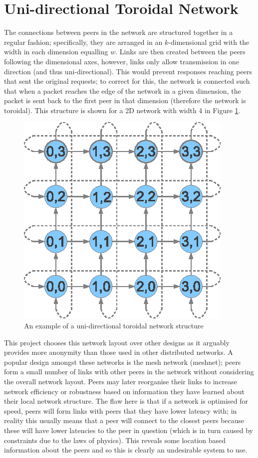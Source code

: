 \documentclass[ %
                    author={Luke Murray},
                supervisor={Dr. Simon Hollis},
                     title={Shadow Peer-to-Peer Networks},
                  subtitle={},
                    degree={MEng},
                      year={2013} ]{thesis}
\begin{document}
\section{Uni-directional Toroidal Network}
\label{sec:network_structure}

The connections between peers in the network are structured together in a regular fashion; specifically, they are arranged in an $k$-dimensional grid with the width in each dimension equalling $w$. Links are then created between the peers following the dimensional axes, however, links only allow transmission in one direction (and thus uni-directional). This would prevent responses reaching peers that sent the original requests; to correct for this, the network is connected such that when a packet reaches the edge of the network in a given dimension, the packet is sent back to the first peer in that dimension (therefore the network is toroidal). This structure is shown for a 2D network with width 4 in Figure \ref{toroid}.

\begin{figure}[h]
\centering
\includegraphics{diagrams/network_toroidal.eps}
\caption{An example of a uni-directional toroidal network structure}
\label{toroid}
\end{figure}

This project chooses this network layout over other designs as it arguably provides more anonymity than those used in other distributed networks. A popular design amongst these networks is the mesh network (meshnet); peers form a small number of links with other peers in the network without considering the overall network layout. Peers may later reorganise their links to increase network efficiency or robustness based on information they have learned about their local network structure. The flaw here is that if a network is optimised for speed, peers will form links with peers that they have lower latency with; in reality this usually means that a peer will connect to the closest peers because these will have lower latencies to the peer in question (which is in turn caused by constraints due to the laws of physics). This reveals some location based information about the peers and so this is clearly an undesirable system to use.
\end{document}
